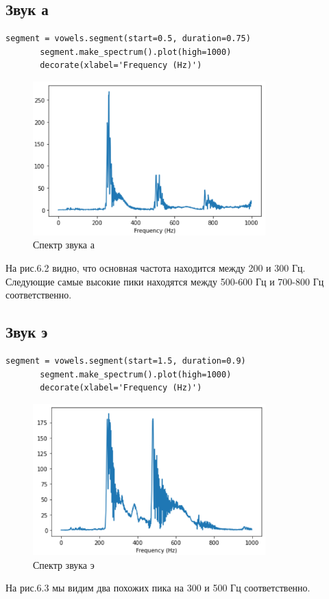 \documentclass[a4paper,12pt]{report}
\begin{document}
\subsection{Звук а}
\begin{lstlisting}[caption=Получение спектра звука а]
       segment = vowels.segment(start=0.5, duration=0.75)
       segment.make_spectrum().plot(high=1000)
       decorate(xlabel='Frequency (Hz)')
\end{lstlisting}
\begin{figure}[H]
        \centering
        \includegraphics[width=0.8\textwidth]{fig6-2.PNG}
        \caption{Спектр звука а}
        \label{fig:fig6-2}
\end{figure}

    На рис.6.2 видно, что основная частота находится между 200 и 300 Гц. Следующие самые высокие пики находятся между 500-600 Гц и 700-800 Гц соответственно.

\subsection{Звук э}
\begin{lstlisting}[caption=Получение спектра звука э]
       segment = vowels.segment(start=1.5, duration=0.9)
       segment.make_spectrum().plot(high=1000)
       decorate(xlabel='Frequency (Hz)')
\end{lstlisting}
\begin{figure}[H]
        \centering
        \includegraphics[width=0.8\textwidth]{fig6-3.PNG}
        \caption{Спектр звука э}
        \label{fig:fig6-3}
\end{figure}
    На рис.6.3 мы видим два похожих пика на 300 и 500 Гц соответственно.
\end{document}
